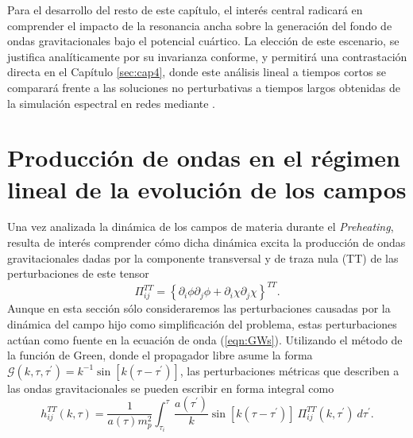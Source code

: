 Para el desarrollo del resto de este capítulo, el interés central radicará en comprender el impacto de la resonancia ancha sobre la generación del fondo de ondas gravitacionales bajo el potencial cuártico. La elección de este escenario, se justifica analíticamente por su invarianza conforme, y permitirá una contrastación directa en el Capítulo \ref{sec:cap4}, donde este análisis lineal a tiempos cortos se comparará frente a las soluciones no perturbativas a tiempos largos obtenidas de la simulación espectral en redes mediante \CosmoLattice \cite{Figueroa_2017_GW, CosmoLatticeNet, Figueroa2021}.

\section{Producción de ondas en el régimen lineal de la evolución de los campos}\label{sec:Produccion_lineal}

Una vez analizada la dinámica de los campos de materia durante el \textit{Preheating}, resulta de interés comprender cómo dicha dinámica excita la producción de ondas gravitacionales dadas por la componente transversal y de traza nula (TT) de las perturbaciones de este tensor \cite{Dufaux_2007}
\begin{equation}
    \Pi_{ij}^{TT} = \left\{ \partial_i \phi \partial_j \phi + \partial_i \chi \partial_j \chi \right\}^{TT}.
\end{equation}
Aunque en esta sección sólo consideraremos las perturbaciones causadas por la dinámica del campo hijo como simplificación del problema, estas perturbaciones actúan como fuente en la ecuación de onda (\ref{eqn:GWs}). Utilizando el método de la función de Green, donde el propagador libre asume la forma $\mathcal{G} (k, \tau, \tau^\prime) = k^{-1} \sin \left[ k \left( \tau - \tau^\prime \right) \right]$, las perturbaciones métricas que describen a las ondas gravitacionales se pueden escribir en forma integral como
\begin{equation}
    h_{ij}^{TT} (k, \tau) = \frac{1}{a(\tau) m_p^2} \int_{\tau_i}^{\tau} \frac{a \left( \tau^\prime \right)}{k} \sin \left[ k \left( \tau - \tau^\prime \right) \right] ~ \Pi^{TT}_{ij} \left( k, \tau^{\prime} \right) ~ d\tau^{\prime}.
\end{equation}

